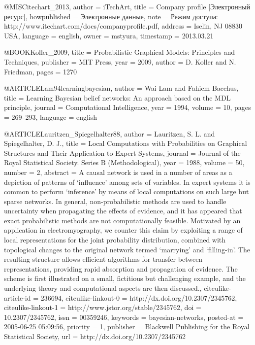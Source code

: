 @MISC{itechart_2013,
  author = {iTechArt},
  title = {Company profile [Электронный ресурс]},
  howpublished = {Электронные данные},
  note = {Режим доступа: http://www.itechart.com/docs/companyprofile.pdf},
  address = {Iselin, NJ 08830 USA},
  language = {english},
  owner = {mstyura},
  timestamp = {2013.03.21}
}

@BOOK{Koller_2009,
  title = {Probabilistic Graphical Models: Principles and Techniques},
  publisher = {MIT Press},
  year = {2009},
  author = {D. Koller and N. Friedman},
  pages = {1270}
}

@ARTICLE{Lam94learningbayesian,
  author = {Wai Lam and Fahiem Bacchus},
  title = {Learning Bayesian belief networks: An approach based on the MDL principle},
  journal = {Computational Intelligence},
  year = {1994},
  volume = {10},
  pages = {269--293},
  language = {english}
}

@ARTICLE{Lauritzen_Spiegelhalter88,
  author = {Lauritzen, S. L. and Spiegelhalter, D. J.},
  title = {{Local Computations with Probabilities on Graphical Structures and
	Their Application to Expert Systems}},
  journal = {Journal of the Royal Statistical Society. Series B (Methodological)},
  year = {1988},
  volume = {50},
  number = {2},
  abstract = {{A causal network is used in a number of areas as a depiction of patterns
	of `influence' among sets of variables. In expert systems it is common
	to perform `inference' by means of local computations on such large
	but sparse networks. In general, non-probabilistic methods are used
	to handle uncertainty when propagating the effects of evidence, and
	it has appeared that exact probabilistic methods are not computationally
	feasible. Motivated by an application in electromyography, we counter
	this claim by exploiting a range of local representations for the
	joint probability distribution, combined with topological changes
	to the original network termed `marrying' and `filling-in'. The resulting
	structure allows efficient algorithms for transfer between representations,
	providing rapid absorption and propagation of evidence. The scheme
	is first illustrated on a small, fictitious but challenging example,
	and the underlying theory and computational aspects are then discussed.}},
  citeulike-article-id = {236694},
  citeulike-linkout-0 = {http://dx.doi.org/10.2307/2345762},
  citeulike-linkout-1 = {http://www.jstor.org/stable/2345762},
  doi = {10.2307/2345762},
  issn = {00359246},
  keywords = {bayesian-networks},
  posted-at = {2005-06-25 05:09:56},
  priority = {1},
  publisher = {Blackwell Publishing for the Royal Statistical Society},
  url = {http://dx.doi.org/10.2307/2345762}
}

